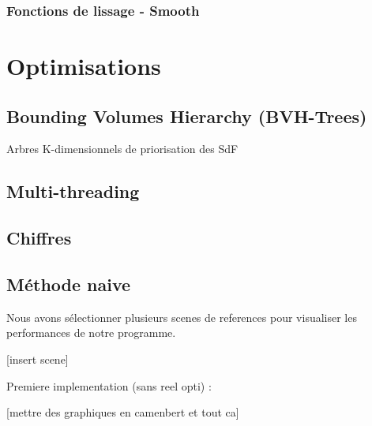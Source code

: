 \documentclass{article}
\begin{document}
\subsubsection{Fonctions de lissage - Smooth}

\section{Optimisations}

\subsection{Bounding Volumes Hierarchy (BVH-Trees)}
Arbres K-dimensionnels de priorisation des SdF

\subsection{Multi-threading}


\subsection{Chiffres}

\subsection{Méthode naive}
Nous avons sélectionner plusieurs scenes de references pour visualiser les performances de notre programme.

[insert scene]

Premiere implementation (sans reel opti) : 

[mettre des graphiques en camenbert et tout ca]
\end{document}
